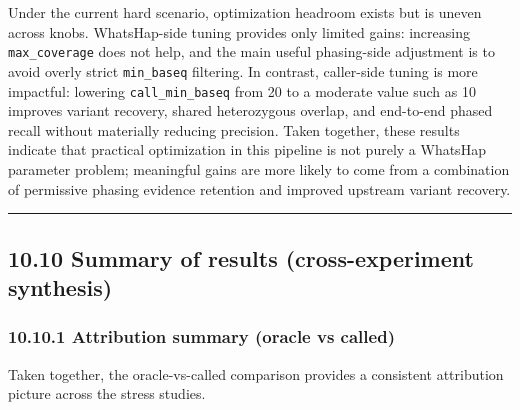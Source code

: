 \documentclass[
]{article}
\begin{document}
Under the current hard scenario, optimization headroom exists but is
uneven across knobs. WhatsHap-side tuning provides only limited gains:
increasing \texttt{max\_coverage} does not help, and the main useful
phasing-side adjustment is to avoid overly strict \texttt{min\_baseq}
filtering. In contrast, caller-side tuning is more impactful: lowering
\texttt{call\_min\_baseq} from 20 to a moderate value such as 10
improves variant recovery, shared heterozygous overlap, and end-to-end
phased recall without materially reducing precision. Taken together,
these results indicate that practical optimization in this pipeline is
not purely a WhatsHap parameter problem; meaningful gains are more
likely to come from a combination of permissive phasing evidence
retention and improved upstream variant recovery.

\begin{center}\rule{0.5\linewidth}{0.5pt}\end{center}

\subsection{10.10 Summary of results (cross-experiment
synthesis)}\label{summary-of-results-cross-experiment-synthesis}

\subsubsection{10.10.1 Attribution summary (oracle vs
called)}\label{attribution-summary-oracle-vs-called}

Taken together, the oracle-vs-called comparison provides a consistent
attribution picture across the stress studies.
\end{document}
